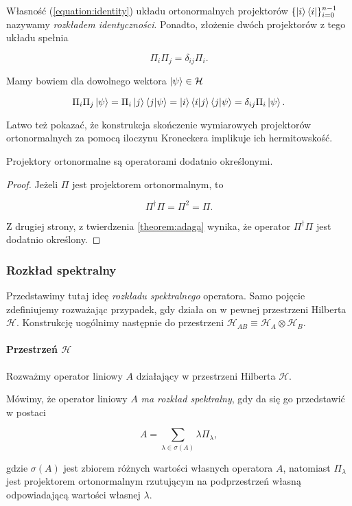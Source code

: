 Własność (\ref{equation:identity}) układu ortonormalnych projektorów $\{\ket{i} \bra{i}\}_{i = 0} ^ {n - 1}$ nazywamy \textit{rozkładem identyczności}. Ponadto, złożenie dwóch projektorów z tego układu spełnia

$$
    \Pi_{i} \Pi_{j} = \delta_{ij} \Pi_{i}.
$$

Mamy bowiem dla dowolnego wektora $\ket{\psi} \in \mathcal{H}$

$$
    \Pi_{i} \Pi_{j} \ket{\psi} = \Pi_{i} \ket{j} \bra{j}\ket{\psi} = \ket{i} \bra{i}\ket{j} \bra{j}\ket{\psi} = \delta_{ij} \Pi_{i} \ket{\psi}.
$$

Latwo też pokazać, że konstrukcja skończenie wymiarowych projektorów ortonormalnych za pomocą iloczynu Kroneckera implikuje ich hermitowskość.

\begin{fact}
    Projektory ortonormalne są operatorami dodatnio określonymi.
\end{fact}

\begin{proof}
    Jeżeli $\Pi$ jest projektorem ortonormalnym, to

    $$
        \Pi ^ {\dag} \Pi = \Pi ^ 2 =\Pi.
    $$

    Z drugiej strony, z twierdzenia \ref{theorem:adaga} wynika, że operator $\Pi ^ {\dag} \Pi$ jest dodatnio określony.
\end{proof}

\subsubsection{Rozkład spektralny}

Przedstawimy tutaj ideę \textit{rozkładu spektralnego} operatora. Samo pojęcie zdefiniujemy rozważając przypadek, gdy działa on w pewnej przestrzeni Hilberta $\mathcal{H}$. Konstrukcję uogólnimy następnie do przestrzeni $\mathcal{H}_{AB} \equiv \mathcal{H}_A \otimes \mathcal{H}_B$.

\paragraph{Przestrzeń $\mathcal{H}$}

Rozważmy operator liniowy $A$ działający w przestrzeni Hilberta $\mathcal{H}$.

\begin{definition}
    Mówimy, że operator liniowy $A$ \textit{ma rozkład spektralny}, gdy da się go przedstawić w postaci

    $$
        A = \sum\limits_{\lambda \in \sigma(A)} \lambda \Pi_{\lambda},
    $$

    gdzie $\sigma(A)$ jest zbiorem różnych wartości własnych operatora $A$, natomiast $\Pi_{\lambda}$ jest projektorem ortonormalnym rzutującym na podprzestrzeń własną odpowiadającą wartości własnej $\lambda$.
\end{definition}

